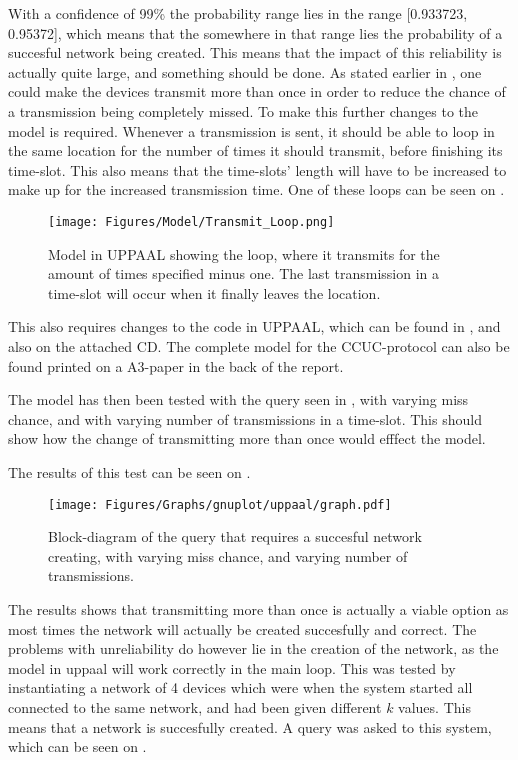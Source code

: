 With a confidence of 99\% the probability range lies in the range [0.933723, 0.95372], which means that the somewhere in that range lies the probability of a succesful network being created.
This means that the impact of this reliability is actually quite large, and something should be done.
As stated earlier in , one could make the devices transmit more than once in order to reduce the chance of a transmission being completely missed.
To make this further changes to the model is required.
Whenever a transmission is sent, it should be able to loop in the same location for the number of times it should transmit, before finishing its time-slot. 
This also means that the time-slots' length will have to be increased to make up for the increased transmission time.
One of these loops can be seen on .

\begin{wrapfigure}{R}{0.5\textwidth}
\centering
  \texttt{[image: Figures/Model/Transmit\_Loop.png]} 
\caption{Model in UPPAAL showing the loop, where it transmits for the amount of times specified minus one. The last transmission in a time-slot will occur when it finally leaves the location.}
\label{LoopTransmitUPPAAL}
\end{wrapfigure}

This also requires changes to the code in UPPAAL, which can be found in , and also on the attached CD.
The complete model for the CCUC-protocol can also be found printed on a A3-paper in the back of the report.

The model has then been tested with the query seen in , with varying miss chance, and with varying number of transmissions in a time-slot.
This should show how the change of transmitting more than once would efffect the model.

The results of this test can be seen on .

\begin{figure}[ht]
  \texttt{[image: Figures/Graphs/gnuplot/uppaal/graph.pdf]} 
\caption{Block-diagram of the query that requires a succesful network creating, with varying miss chance, and varying number of transmissions.}
\label{CCUC-Graph-UPPAAL}
\end{figure}

The results shows that transmitting more than once is actually a viable option as most times the network will actually be created succesfully and correct.
The problems with unreliability do however lie in the creation of the network, as the model in uppaal will work correctly in the main loop.
This was tested by instantiating a network of 4 devices which were when the system started all connected to the same network, and had been given different $k$ values. 
This means that a network is succesfully created.
A query was asked to this system, which can be seen on .

